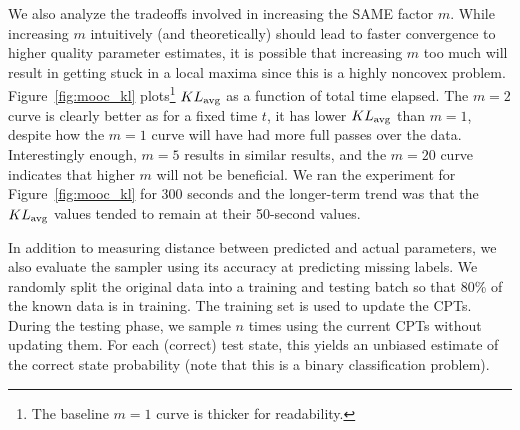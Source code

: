 \documentclass{article} %
\begin{document}
We also analyze the tradeoffs involved in increasing the SAME factor $m$. While increasing $m$
intuitively (and theoretically) should lead to faster convergence to higher quality parameter
estimates, it is possible that increasing $m$ too much will result in getting stuck in a local
maxima since this is a highly noncovex problem. Figure~\ref{fig:mooc_kl} plots\footnote{The baseline
$m=1$ curve is thicker for readability.} $KL_{\rm avg}$ as a function of total time elapsed. The
$m=2$ curve is clearly better as for a fixed time $t$, it has lower $KL_{\rm avg}$ than $m=1$,
despite how the $m=1$ curve will have had more full passes over the data. Interestingly enough,
$m=5$ results in similar results, and the $m=20$ curve indicates that higher $m$ will not be
beneficial.  We ran the experiment for Figure~\ref{fig:mooc_kl} for 300 seconds and the longer-term
trend was that the $KL_{\rm avg}$ values tended to remain at their 50-second values.

In addition to measuring distance between predicted and actual parameters, we also evaluate the
sampler using its accuracy at predicting missing labels.  We randomly split the original data into a
training and testing batch so that 80\% of the known data is in training. The training set is used
to update the CPTs. During the testing phase, we sample $n$ times using the current CPTs without
updating them. For each (correct) test state, this yields an unbiased estimate of the correct state
probability (note that this is a binary classification problem).



\end{document}
